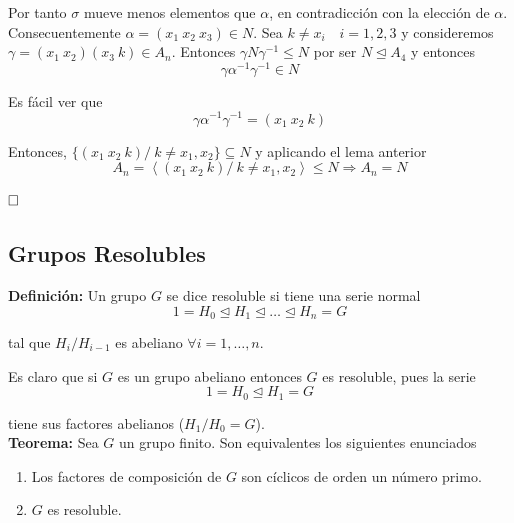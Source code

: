 \documentclass{article}
\begin{document}
\begin{enumerate}[\bfseries C{a}so 1]
Por tanto $\sigma$ mueve menos elementos que $\alpha$, en contradicción con la elección de $\alpha$. \\

Consecuentemente $\alpha=(x_1\:x_2\:x_3)\in N$. Sea $k\neq x_i\quad i=1,2,3$ y consideremos $\gamma=(x_1\:x_2)(x_3\:k)\in A_n$. Entonces $\gamma N\gamma^{-1}\leq N$ por ser $N\unlhd A_4$ y entonces
\begin{equation*}
\gamma \alpha^{-1}\gamma^{-1}\in N
\end{equation*}

Es fácil ver que
\begin{equation*}
\gamma \alpha^{-1}\gamma^{-1}=(x_1\:x_2\:k)
\end{equation*}

Entonces, $\{(x_1\:x_2\:k)/\:k\neq x_1,x_2\}\subseteq N$ y aplicando el lema anterior
\begin{equation*}
A_n=\left\langle (x_1\:x_2\:k)/\:k\neq x_1,x_2\right\rangle \leq N\Rightarrow A_n=N
\end{equation*}
\end{enumerate}

$\hfill\square$ \\

\subsection{Grupos Resolubles}

\textbf{Definición:} Un grupo $G$ se dice resoluble si tiene una serie normal
\begin{equation*}
1=H_0\unlhd H_1\unlhd \ldots \unlhd H_n=G
\end{equation*}

tal que $H_i/H_{i-1}$ es abeliano $\forall i=1,\ldots,n$.

Es claro que si $G$ es un grupo abeliano entonces $G$ es resoluble, pues la serie
\begin{equation*}
1=H_0\unlhd H_1=G
\end{equation*}

tiene sus factores abelianos ($H_1/H_0=G$). \\

\textbf{Teorema:} Sea $G$ un grupo finito. Son equivalentes los siguientes enunciados
\begin{enumerate}[\bfseries (i)]
\item Los factores de composición de $G$ son cíclicos de orden un número primo.

\item $G$ es resoluble.
\end{enumerate}
\end{document}
